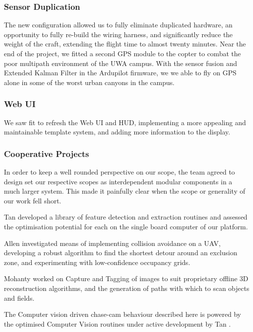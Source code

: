 \documentclass[a4paper, 11pt, titlepage]{article}
\begin{document}
    \subsubsection{Sensor Duplication}
    The new configuration allowed us to fully eliminate duplicated hardware, an opportunity to fully re-build the wiring harness, and significantly reduce the weight of the craft, extending the flight time to almost twenty minutes.
    Near the end of the project, we fitted a second GPS module to the copter to combat the poor multipath environment of the UWA campus.  With the sensor fusion and Extended Kalman Filter in the Ardupilot firmware, we we able to fly on GPS alone in some of the worst urban canyons in the campus.


    \subsubsection{Web UI}
    We saw fit to refresh the Web UI and HUD, implementing a more appealing and maintainable template system, and adding more information to the display.

    \subsubsection{Cooperative Projects}
    In order to keep a well rounded perspective on our scope, the team agreed to design set our respective scopes as interdependent modular components in a much larger system.  This made it painfully clear when the scope or generality of our work fell short.
    
    Tan \cite{Tan} developed a library of feature detection and extraction routines and assessed the optimisation potential for each on the single board computer of our platform.

    Allen \cite{Allen} investigated means of implementing collision avoidance on a UAV, developing a robust algorithm to find the shortest detour around an exclusion zone, and experimenting with low-confidence occupancy grids.

    Mohanty \cite{Mohanty} worked on Capture and Tagging of images to suit proprietary offline 3D reconstruction algorithms, and the generation of paths with which to scan objects and fields.

    The Computer vision driven chase-cam behaviour described here is powered by the optimised Computer Vision routines under active development by Tan \cite{Tan}.
\end{document}
